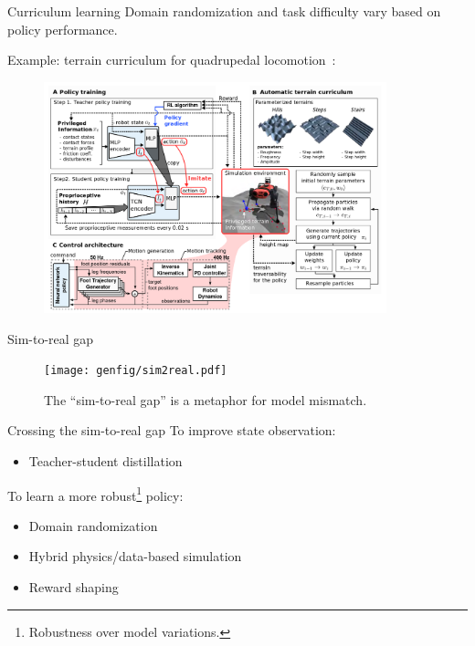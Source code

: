 \documentclass[10pt, aspectratio=1610]{beamer}
\begin{document}
\begin{frame}{Curriculum learning}
    Domain randomization and task difficulty vary based on policy performance.

    Example: terrain curriculum for quadrupedal locomotion~\cite{lee2020}:
    \begin{figure}
        \includegraphics[height=6.7cm]{figures/quadruped-curriculum.png}
    \end{figure}
\end{frame}

\begin{frame}{Sim-to-real gap}
    \begin{figure}
        \texttt{[image: genfig/sim2real.pdf]}
        \caption{The ``sim-to-real gap'' is a metaphor for model mismatch.}
    \end{figure}
\end{frame}

\begin{frame}{Crossing the sim-to-real gap}
    To improve state observation:
    \begin{itemize}
        \item Teacher-student distillation
    \end{itemize}
    To learn a more robust\footnote{Robustness over model variations.} policy:
    \begin{itemize}
        \item Domain randomization
        \item Hybrid physics/data-based simulation
        \item Reward shaping
    \end{itemize}
\end{frame}
\end{document}
